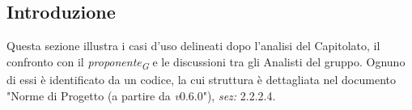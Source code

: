 \subsection{Introduzione}
Questa sezione illustra i casi d'uso delineati dopo l'analisi del Capitolato, il confronto con il \textit{proponente}\textsubscript{\textit{G}} e le discussioni tra gli Analisti del gruppo. Ognuno di essi è identificato da un codice, la cui struttura è dettagliata nel documento "Norme di Progetto (a partire da \textit{v}0.6.0"), \textit{sez:} 2.2.2.4.